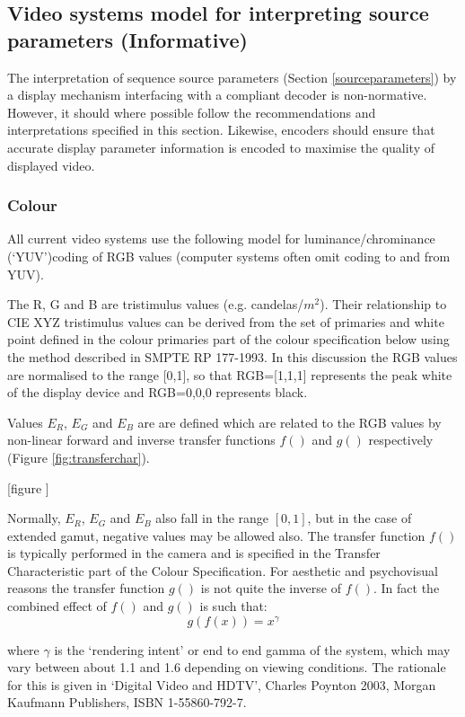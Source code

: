 \label{vidsys}

\begin{informative*}
\subsection{Video systems model for interpreting source parameters (Informative)}
\label{vidsysmodel}

The interpretation of sequence source parameters (Section \ref{sourceparameters})
by a display mechanism interfacing with a compliant decoder is non-normative. However, it
should where possible follow the recommendations and interpretations
specified in this section. Likewise, encoders should ensure that
accurate display parameter information is encoded to maximise the
quality of displayed video.
\subsubsection{Colour}
All current video systems use the following model for luminance/chrominance 
(`YUV')coding of RGB values (computer systems often omit coding to and from YUV). 

The R, G and B are tristimulus values (e.g. candelas/$m^2$). Their
relationship to CIE XYZ tristimulus values can be derived from the set
of primaries and white point defined in the colour primaries part of the
colour specification below using the method described in SMPTE RP
177-1993. In this discussion the RGB values are normalised to the range
[0,1], so that RGB=[1,1,1] represents the peak white of the display device
and RGB=0,0,0 represents black.

Values $E_R$, $E_G$ and $E_B$ are are defined which are related to the RGB 
values by non-linear forward and inverse transfer functions $f()$ and $g()$ respectively
(Figure \ref{fig:transferchar}).

[figure \label{fig:transferchar}]

Normally, $E_R$, $E_G$ and $E_B$ also fall in the range $[0,1]$, but in the
case of extended gamut, negative values may be allowed also. The
transfer function $f()$ is typically performed in the camera and
is specified in the Transfer Characteristic part of the
Colour Specification. For aesthetic and psychovisual reasons
the transfer function $g()$ is not quite the inverse of
$f()$. In fact the combined effect of $f()$ and
$g()$ is such that:
\[g(f(x))=x^\gamma\]

where $\gamma$ is the `rendering intent' or end to end gamma of the
system, which may vary between about 1.1 and 1.6 depending on viewing
conditions. The rationale for this is given in `Digital Video and HDTV',
Charles Poynton 2003, Morgan Kaufmann Publishers, ISBN 1-55860-792-7.


\end{informative*}
